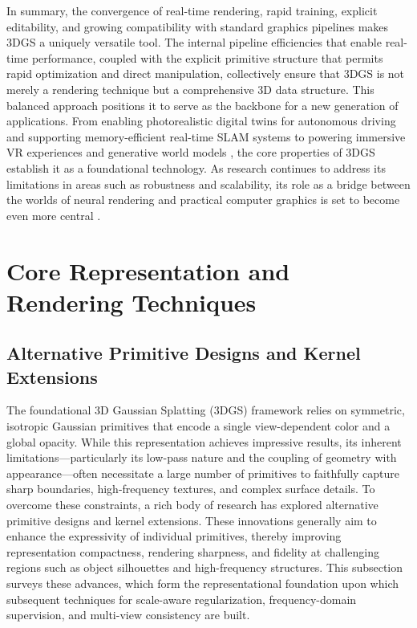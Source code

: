\documentclass[11pt]{article}
\begin{document}
In summary, the convergence of real-time rendering, rapid training, explicit editability, and growing compatibility with standard graphics pipelines makes 3DGS a uniquely versatile tool. The internal pipeline efficiencies that enable real-time performance, coupled with the explicit primitive structure that permits rapid optimization and direct manipulation, collectively ensure that 3DGS is not merely a rendering technique but a comprehensive 3D data structure. This balanced approach positions it to serve as the backbone for a new generation of applications. From enabling photorealistic digital twins for autonomous driving \cite{ref52} and supporting memory-efficient real-time SLAM systems \cite{ref53} to powering immersive VR experiences and generative world models \cite{ref4,ref41}, the core properties of 3DGS establish it as a foundational technology. As research continues to address its limitations in areas such as robustness and scalability, its role as a bridge between the worlds of neural rendering and practical computer graphics is set to become even more central \cite{ref1,ref54}.

\section{Core Representation and Rendering Techniques}

\subsection{Alternative Primitive Designs and Kernel Extensions}

The foundational 3D Gaussian Splatting (3DGS) framework relies on symmetric, isotropic Gaussian primitives that encode a single view-dependent color and a global opacity. While this representation achieves impressive results, its inherent limitations---particularly its low-pass nature and the coupling of geometry with appearance---often necessitate a large number of primitives to faithfully capture sharp boundaries, high-frequency textures, and complex surface details. To overcome these constraints, a rich body of research has explored alternative primitive designs and kernel extensions. These innovations generally aim to enhance the expressivity of individual primitives, thereby improving representation compactness, rendering sharpness, and fidelity at challenging regions such as object silhouettes and high-frequency structures. This subsection surveys these advances, which form the representational foundation upon which subsequent techniques for scale-aware regularization, frequency-domain supervision, and multi-view consistency are built.
\end{document}

